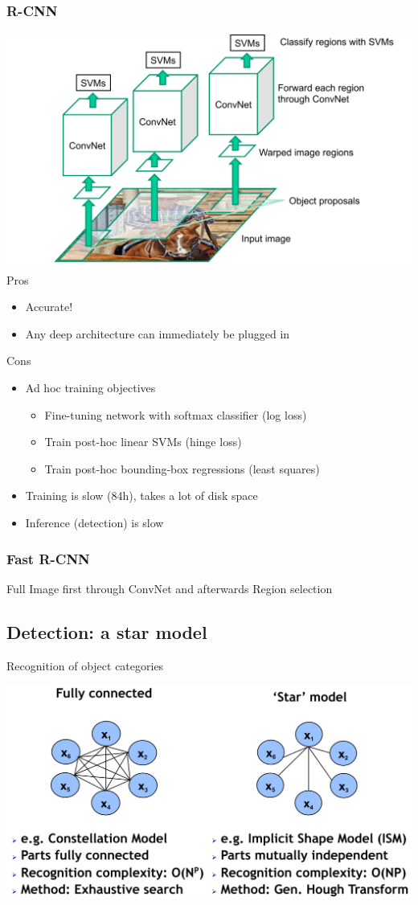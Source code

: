 \subsubsection{R-CNN}
\includegraphics[width=\columnwidth]{pictures/R-CNN}
Pros
\begin{itemize}
	\item Accurate!
	\item Any deep architecture can immediately be plugged in
\end{itemize}
Cons
\begin{itemize}
	\item Ad hoc training objectives
	\begin{itemize}
		\item Fine-tuning network with softmax classifier (log loss)
		\item Train post-hoc linear SVMs (hinge loss)
		\item Train post-hoc bounding-box regressions (least squares)
	\end{itemize}
	\item Training is slow (84h), takes a lot of disk space
	\item Inference (detection) is slow
\end{itemize}
\subsubsection{Fast R-CNN}
Full Image first through ConvNet and afterwards Region selection
\subsection{Detection: a star model}
Recognition of object categories

\includegraphics[width=\columnwidth]{pictures/star_models}

